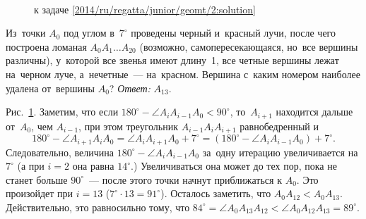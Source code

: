 \ifsolution
\begin{figure}\centering
\\[1ex]
    \caption{к задаче \ref{2014/ru/regatta/junior/geomt/2:solution}}
    \label{2014/ru/regatta/junior/geomt/2:solution:fig}
\end{figure}%
\fi %

\problem
Из~точки $A_0$ под углом в~$7^\circ$ проведены черный и~красный лучи, после
чего построена ломаная $A_{0} A_{1} \ldots A_{20}$
(возможно, самопересекающаяся, но~все вершины различны), у~которой все звенья
имеют длину~1, все четные вершины лежат на~черном луче, а~нечетные~---
на~красном.
Вершина с~каким номером наиболее удалена от~вершины $A_0$?
\solution
\label{2014/ru/regatta/junior/geomt/2:solution}%
\emph{Ответ:} $A_{13}$.
\par
Рис.~\ref{2014/ru/regatta/junior/geomt/2:solution:fig}.
Заметим, что если $180^\circ - \angle A_{i} A_{i-1} A_0 < 90^\circ$,
то~$A_{i+1}$ находится дальше от~$A_0$, чем $A_{i-1}$, при этом треугольник
$A_{i-1} A_{i} A_{i+1}$ равнобедренный и
\[
    180^\circ - \angle A_{i+1} A_i A_0
=
    \angle A_i A_{i+1} A_0 + 7^\circ
=
    (180^\circ-\angle A_i A_{i-1} A_0) + 7^\circ
.\]
Следовательно, величина $180^\circ-\angle A_{i} A_{i-1} A_0$ за~одну итерацию
увеличивается на $7^\circ$ (а при $i = 2$ она равна $14^\circ$.)
Увеличиваться она может до тех пор, пока не станет больше $90^\circ$~---
после этого точки начнут приближаться к $A_0$.
Это произойдет при $i = 13$ ($7^\circ \cdot 13 = 91^\circ$).
Осталось заметить, что $A_0 A_{12} < A_0 A_{13}$.
Действительно, это равносильно тому, что 
\(
    84^\circ = \angle A_0 A_{13} A_{12}
<
    \angle A_0 A_{12} A_{13} = 89^\circ
\).
\endproblem
